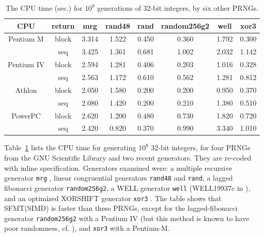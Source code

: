 \documentclass[acmnow]{acmtrans2m}
\begin{document}
\begin{table}
\begin{center}
\begin{tabular}{|c|c||c|c|c|c|c|c|}
\hline
CPU & return & mrg & rand48 & rand & random256g2 & well & xor3  \\ \hline \hline
Pentium M & block & 3.314  & 1.522  & 0.450  & 0.360  & 1.792  & 0.300 \\
\cline{2-8}
 & seq & 3.425  & 1.361  & 0.681  & 1.002  & 2.032  & 1.142 \\ \hline
Pentium IV & block & 2.594  & 1.281  & 0.406  & 0.203  & 1.016  & 0.328 \\ 
\cline{2-8}
 & seq & 2.563  & 1.172  & 0.610  & 0.562  & 1.281  & 0.812 \\ \hline
Athlon & block & 2.050  & 1.580  & 0.200  & 0.200  & 0.950  & 0.370 \\ 
\cline{2-8}
 & seq & 2.080  & 1.420  & 0.200  & 0.210  & 1.380  & 0.510 \\ \hline
PowerPC & block & 2.620  & 1.200  & 0.480  & 0.730  & 1.820  & 0.720 \\ 
\cline{2-8}
 & seq & 2.420  & 0.820  & 0.370  & 0.990  & 3.340  & 1.010 \\ \hline
\end{tabular}
\end{center}
\caption{The CPU time (sec.) for $10^8$ generations of 32-bit integers,
by six other PRNGs.}\label{tab:speed-other}
\end{table}
Table~\ref{tab:speed-other} lists the CPU time for generating
$10^8$ 32-bit integers, for four PRNGs from the GNU Scientific Library
and two recent generators. 
They are re-coded with inline specification. 
Generators examined were:
a multiple recursive generator {\tt mrg} \cite{MRG}, 
linear congruential generators {\tt rand48} and {\tt rand}, 
a lagged fibonacci generator {\tt random256g2},
a WELL generator {\tt well} (WELL19937c in \cite{WELL}),
and an optimized XORSHIFT generator {\tt xor3} 
\cite{XORSHIFT} \cite{XORSHIFT-MAR}.
The table shows that SFMT(SIMD) is faster than
these PRNGs, except for the lagged-fibonacci
generator {\tt random256g2} with a Pentium IV
(but this method is known to
 have poor randomness, cf. \cite{SUM}),
and {\tt xor3} with a Pentium-M.
\end{document}
